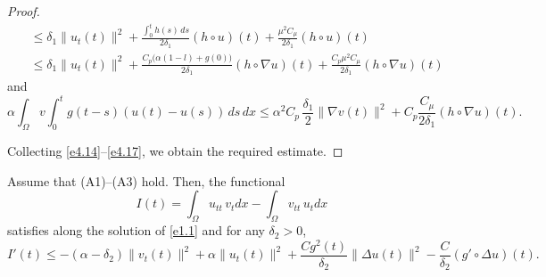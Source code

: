 \begin{proof}
\begin{equation}
\begin{aligned}
&\leq \delta_{1} \| u_t(t) \|^2+ \frac{ \int_0^{t} h(s) \, ds }{2\delta_{1}}
 (h \circ u)(t)+ \frac{\mu^2 C_\mu }{2\delta_{1}} (h \circ u)(t)\\
&\leq \delta_{1} \| u_t(t) \|^2+ \frac{C_p \big(\alpha(1-l)+g(0)\big)}{2\delta_{1}}
 (h \circ \nabla u)(t)+ \frac{C_p\mu^2 C_\mu }{2\delta_{1}} (h \circ \nabla u)(t)
\end{aligned} \label{e4.16}
\end{equation}
and
\begin{equation}
 \alpha \int_{\Omega} v  \int_0^t g(t - s)(u(t) - u(s)) \, ds \, dx
 \leq \alpha^2 C_p \,\frac{\delta_{1}}{2} \| \nabla v(t) \|^2
 + C_p \frac{ C_\mu}{ 2 \delta_{1}} (h \circ \nabla u)(t).\label{e4.17}
\end{equation}

Collecting  \eqref{e4.14}--\eqref{e4.17}, we obtain the required estimate.
\end{proof}

\begin{lemma} \label{lem9}
Assume that {\rm (A1)--(A3)} hold. Then, the functional
\begin{equation*}
 I(t) = \int_{\Omega} u_{tt} \, v_t dx - \int_{\Omega} v_{tt} \, u_t dx
 \end{equation*}
 satisfies along the solution of \eqref{e1.1} and for any $\delta_2>0$,
 \begin{equation}
 I'(t) \leq - ( \alpha- \delta_2) \| v_t (t) \|^2+ \alpha \| u_t (t) \|^2
 + \frac{C g^2(t)}{\delta_2} \| \Delta u(t) \|^2-\frac{C}{ \delta_2}
 (g' \circ \Delta u)(t). \label{e4.18}
\end{equation}
\end{lemma}

